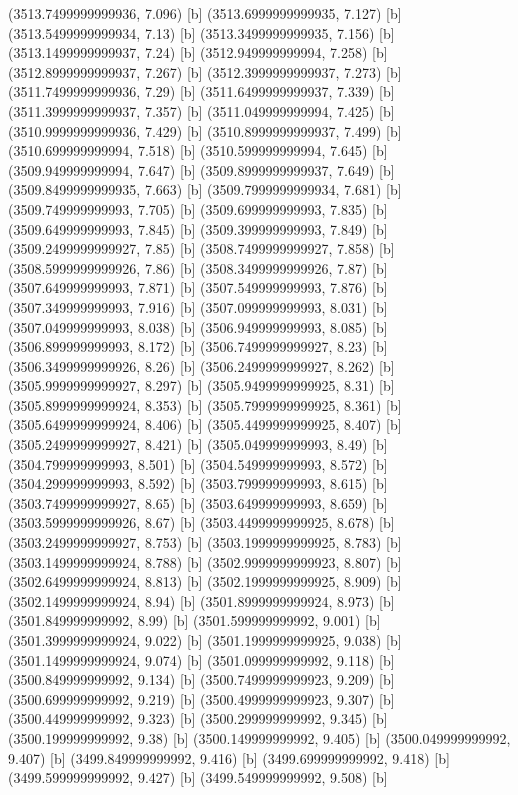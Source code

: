 {{{(3513.7499999999936, 7.096) [b] 
(3513.6999999999935, 7.127) [b] 
(3513.5499999999934, 7.13) [b] 
(3513.3499999999935, 7.156) [b] 
(3513.1499999999937, 7.24) [b] 
(3512.949999999994, 7.258) [b] 
(3512.8999999999937, 7.267) [b] 
(3512.3999999999937, 7.273) [b] 
(3511.7499999999936, 7.29) [b] 
(3511.6499999999937, 7.339) [b] 
(3511.3999999999937, 7.357) [b] 
(3511.049999999994, 7.425) [b] 
(3510.9999999999936, 7.429) [b] 
(3510.8999999999937, 7.499) [b] 
(3510.699999999994, 7.518) [b] 
(3510.599999999994, 7.645) [b] 
(3509.949999999994, 7.647) [b] 
(3509.8999999999937, 7.649) [b] 
(3509.8499999999935, 7.663) [b] 
(3509.7999999999934, 7.681) [b] 
(3509.749999999993, 7.705) [b] 
(3509.699999999993, 7.835) [b] 
(3509.649999999993, 7.845) [b] 
(3509.399999999993, 7.849) [b] 
(3509.2499999999927, 7.85) [b] 
(3508.7499999999927, 7.858) [b] 
(3508.5999999999926, 7.86) [b] 
(3508.3499999999926, 7.87) [b] 
(3507.649999999993, 7.871) [b] 
(3507.549999999993, 7.876) [b] 
(3507.349999999993, 7.916) [b] 
(3507.099999999993, 8.031) [b] 
(3507.049999999993, 8.038) [b] 
(3506.949999999993, 8.085) [b] 
(3506.899999999993, 8.172) [b] 
(3506.7499999999927, 8.23) [b] 
(3506.3499999999926, 8.26) [b] 
(3506.2499999999927, 8.262) [b] 
(3505.9999999999927, 8.297) [b] 
(3505.9499999999925, 8.31) [b] 
(3505.8999999999924, 8.353) [b] 
(3505.7999999999925, 8.361) [b] 
(3505.6499999999924, 8.406) [b] 
(3505.4499999999925, 8.407) [b] 
(3505.2499999999927, 8.421) [b] 
(3505.049999999993, 8.49) [b] 
(3504.799999999993, 8.501) [b] 
(3504.549999999993, 8.572) [b] 
(3504.299999999993, 8.592) [b] 
(3503.799999999993, 8.615) [b] 
(3503.7499999999927, 8.65) [b] 
(3503.649999999993, 8.659) [b] 
(3503.5999999999926, 8.67) [b] 
(3503.4499999999925, 8.678) [b] 
(3503.2499999999927, 8.753) [b] 
(3503.1999999999925, 8.783) [b] 
(3503.1499999999924, 8.788) [b] 
(3502.9999999999923, 8.807) [b] 
(3502.6499999999924, 8.813) [b] 
(3502.1999999999925, 8.909) [b] 
(3502.1499999999924, 8.94) [b] 
(3501.8999999999924, 8.973) [b] 
(3501.849999999992, 8.99) [b] 
(3501.599999999992, 9.001) [b] 
(3501.3999999999924, 9.022) [b] 
(3501.1999999999925, 9.038) [b] 
(3501.1499999999924, 9.074) [b] 
(3501.099999999992, 9.118) [b] 
(3500.849999999992, 9.134) [b] 
(3500.7499999999923, 9.209) [b] 
(3500.699999999992, 9.219) [b] 
(3500.4999999999923, 9.307) [b] 
(3500.449999999992, 9.323) [b] 
(3500.299999999992, 9.345) [b] 
(3500.199999999992, 9.38) [b] 
(3500.149999999992, 9.405) [b] 
(3500.049999999992, 9.407) [b] 
(3499.849999999992, 9.416) [b] 
(3499.699999999992, 9.418) [b] 
(3499.599999999992, 9.427) [b] 
(3499.549999999992, 9.508) [b] 
}}}
